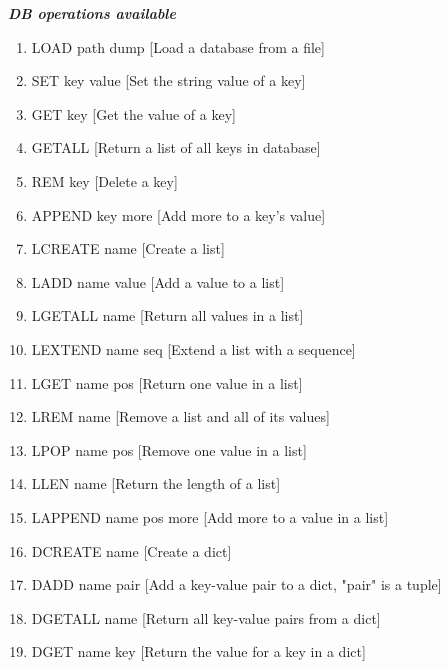 \textbf{\textit{DB operations available}}
\begin{enumerate}

\item  LOAD path dump  [Load a database from a file]

\item  SET key value [Set the string value of a key]

\item  GET key  [Get the value of a key] 

\item  GETALL [Return a list of all keys in database] 

\item  REM key [Delete a key] 

\item  APPEND key more [Add more to a key's value]

\item  LCREATE name [Create a list]

\item  LADD name value  [Add a value to a list]

\item  LGETALL name [Return all values in a list]

\item  LEXTEND name seq [Extend a list with a sequence]

\item  LGET name pos [Return one value in a list]

\item  LREM name [Remove a list and all of its values]

\item  LPOP name pos [Remove one value in a list]

\item  LLEN name [Return the length of a list]

\item  LAPPEND name pos more [Add more to a value in a list]

\item  DCREATE name [Create a dict]

\item  DADD name pair [Add a key-value pair to a dict, "pair" is a tuple]

\item  DGETALL name [Return all key-value pairs from a dict]

\item  DGET name key [Return the value for a key in a dict]


\end{enumerate}
